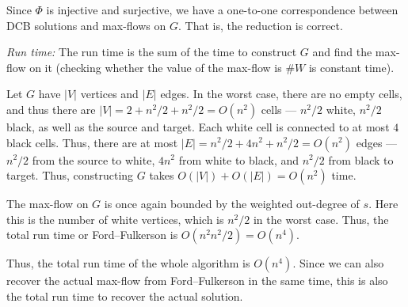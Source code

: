 \documentclass[12 pt, letterpaper]{hmcpset}
\begin{document}
\begin{solution}
	Since $\Phi$ is injective and surjective, we have a one-to-one correspondence between DCB solutions and max-flows on $G$. That is, the reduction is correct.

	\emph{Run time:} The run time is the sum of the time to construct $G$ and find the max-flow on it (checking whether the value of the max-flow is $\# W$ is constant time).

	Let $G$ have $\lvert V \rvert$ vertices and $\lvert E \rvert$ edges. In the worst case, there are no empty cells, and thus there are $\lvert V \rvert = 2 + n^{2} / 2 + n^{2} / 2 = O(n^{2})$ cells --- $n^{2}/ 2$ white, $n^{2} / 2$ black, as well as the source and target. Each white cell is connected to at most $4$ black cells. Thus, there are at most $\lvert E \rvert = n^{2} / 2 + 4 n^{2} + n^{2} / 2 = O(n^{2})$ edges --- $n^{2} / 2$ from the source to white, $4 n^{2}$ from white to black, and $n^{2} / 2$ from black to target. Thus, constructing $G$ takes $O(\lvert V \rvert) + O(\lvert E \rvert) = O(n^{2})$ time.

	The max-flow on $G$ is once again bounded by the weighted out-degree of $s$. Here this is the number of white vertices, which is $n^{2} / 2$ in the worst case. Thus, the total run time or Ford--Fulkerson is $O(n^{2} n^{2} / 2) = O(n^{4})$.

	Thus, the total run time of the whole algorithm is $O(n^{4})$. Since we can also recover the actual max-flow from Ford--Fulkerson in the same time, this is also the total run time to recover the actual solution.
\end{solution}
\end{document}
